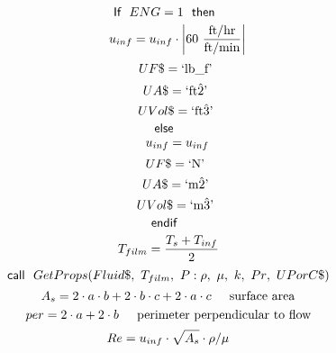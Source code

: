 \documentclass[10pt,fleqn]{article}
\newcommand{\F}[1]{\mbox{$#1$}}
\newcommand{\K}[1]{\mbox{\sf#1\ \ \mit}}
\newcommand{\KS}[1]{\mbox{\sf\ \ #1\ \ \mit}}
\newcommand{\SC}[1]{\mbox{`#1'}\  }
\newcommand{\V}[1]{\mbox{$ #1 $}}
\newcommand{\I}{\mbox{\hspace{0.20in}}}
\begin{document}
\begin{equation}
\I \label{EES Eqn:117}
\K{If} \V{ENG} =1 \KS{then} 
\end{equation}
\begin{equation}
\I \I \label{EES Eqn:118}
u_{inf}=u_{inf}\cdot \rm { \left|60\ \frac {\rm{ft/hr}}{\rm{ft/min}}\right|} 
\end{equation}
\begin{equation}
\I \I \label{EES Eqn:119}
UF\$=\SC{lb\_f} 
\end{equation}
\begin{equation}
\I \I \label{EES Eqn:120}
UA\$=\SC{ft\^2} 
\end{equation}
\begin{equation}
\I \I \label{EES Eqn:121}
UVol\$=\SC{ft\^3} 
\end{equation}
\begin{equation}
\I \label{EES Eqn:122}
\K{else} 
\end{equation}
\begin{equation}
\I \I \label{EES Eqn:123}
u_{inf}=u_{inf} 
\end{equation}
\begin{equation}
\I \I \label{EES Eqn:124}
UF\$=\SC{N} 
\end{equation}
\begin{equation}
\I \I \label{EES Eqn:125}
UA\$=\SC{m\^2} 
\end{equation}
\begin{equation}
\I \I \label{EES Eqn:126}
UVol\$=\SC{m\^3} 
\end{equation}
\begin{equation}
\I \label{EES Eqn:127}
\K{endif} 
\end{equation}
\begin{equation}
\I \label{EES Eqn:128}
T_{film}=\frac {T_{s}+T_{inf}}{ 2 } 
\end{equation}
\begin{equation}
\I \label{EES Eqn:129}
\K{call} \F{GetProps}{ \left( Fluid\$,\ T_{film},\ P: \rho,\ \mu,\ k,\ \V{Pr} ,\ UPorC\$ \right) } 
\end{equation}
\begin{equation}
\I \label{EES Eqn:130}
A_{s}=2\cdot a\cdot b+2\cdot b\cdot c+2\cdot a\cdot \V{c	}  
\mbox{\I surface area}
\end{equation}
\begin{equation}
\I \label{EES Eqn:131}
\V{per} =2\cdot a+2\cdot \V{b	}  
\mbox{\I perimeter perpendicular to flow}
\end{equation}
\begin{equation}
\I \label{EES Eqn:132}
\V{Re} =u_{inf}\cdot \sqrt{  A_{s}  }\cdot \rho/\mu 
\end{equation}
\end{document}
